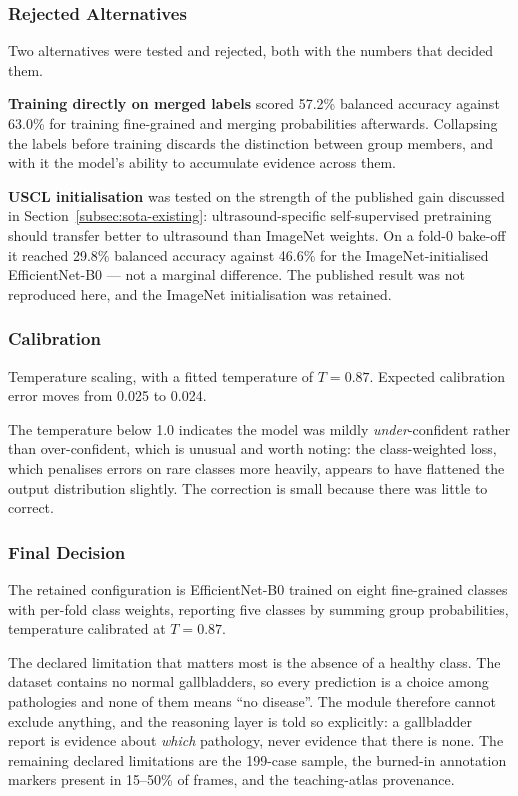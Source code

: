 \subsubsection{Rejected Alternatives}

Two alternatives were tested and rejected, both with the numbers that decided them.

\textbf{Training directly on merged labels} scored 57.2\% balanced accuracy against 63.0\% for
training fine-grained and merging probabilities afterwards. Collapsing the labels before
training discards the distinction between group members, and with it the model's ability to
accumulate evidence across them.

\textbf{USCL initialisation} was tested on the strength of the published gain discussed in
Section~\ref{subsec:sota-existing}: ultrasound-specific self-supervised pretraining should
transfer better to ultrasound than ImageNet weights. On a fold-0 bake-off it reached 29.8\%
balanced accuracy against 46.6\% for the ImageNet-initialised EfficientNet-B0 --- not a marginal
difference. The published result was not reproduced here, and the ImageNet initialisation was
retained.

\subsubsection{Calibration}

Temperature scaling, with a fitted temperature of $T = 0.87$. Expected calibration error moves
from 0.025 to 0.024.

The temperature below 1.0 indicates the model was mildly \emph{under}-confident rather than
over-confident, which is unusual and worth noting: the class-weighted loss, which penalises
errors on rare classes more heavily, appears to have flattened the output distribution slightly.
The correction is small because there was little to correct.

\subsubsection{Final Decision}

The retained configuration is EfficientNet-B0 trained on eight fine-grained classes with
per-fold class weights, reporting five classes by summing group probabilities, temperature
calibrated at $T = 0.87$.

The declared limitation that matters most is the absence of a healthy class. The dataset
contains no normal gallbladders, so every prediction is a choice among pathologies and none of
them means ``no disease''. The module therefore cannot exclude anything, and the reasoning layer
is told so explicitly: a gallbladder report is evidence about \emph{which} pathology, never
evidence that there is none. The remaining declared limitations are the 199-case sample, the
burned-in annotation markers present in 15--50\% of frames, and the teaching-atlas provenance.

